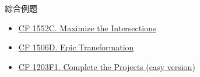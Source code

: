 \documentclass[aspectratio=169]{beamer}
\begin{document}
    \begin{frame}{綜合例題}
        \begin{itemize}
            \item \href{https://codeforces.com/contest/1552/problem/C}{CF 1552C. Maximize the Intersections}
            \item \href{C. Maximize the Intersections}{CF 1506D. Epic Transformation}
            \item \href{https://codeforces.com/problemset/problem/1203/F1}{CF 1203F1. Complete the Projects (easy version)}
        \end{itemize}
    \end{frame}
\end{document}
